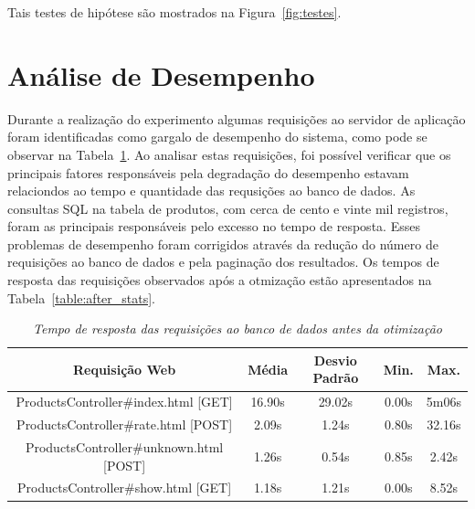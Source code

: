  Tais testes de hipótese são mostrados na Figura~\ref{fig:testes}.

\section{Análise de Desempenho}
\label{sec:analise_de_desempenho}


Durante a realização do experimento algumas requisições ao servidor de aplicação foram identificadas como gargalo de desempenho do sistema, como pode se observar na Tabela~\ref{table:before_stats}. Ao analisar estas requisições, foi possível verificar que os principais fatores responsáveis pela degradação do desempenho estavam relaciondos ao tempo e quantidade das requsições ao banco de dados. As consultas SQL na tabela de produtos, com cerca de cento e vinte mil registros, foram as principais responsáveis pelo excesso no tempo de resposta. Esses problemas de desempenho foram corrigidos através da redução do número de requisições ao banco de dados e pela paginação dos resultados. Os tempos de resposta das requisições observados após a otmização estão apresentados na Tabela~\ref{table:after_stats}.

\begin{table}\centering
\begin{tabular}{c c c c c}
\hline \hline
\textbf{Requisição Web}
& \textbf{Média}
& \textbf{Desvio Padrão}
& \textbf{Min.} 
& \textbf{Max.} \\ \hline
ProductsController\#index.html [GET]    & 16.90s & 29.02s &  0.00s &  5m06s \\
\hline
ProductsController\#rate.html [POST]    &  2.09s &  1.24s &  0.80s & 32.16s \\
\hline
ProductsController\#unknown.html [POST] &  1.26s &  0.54s &  0.85s &  2.42s \\
\hline
ProductsController\#show.html [GET]     &  1.18s &  1.21s &  0.00s &  8.52s \\
\hline
\end{tabular}
\caption{\it Tempo de resposta das requisições ao banco de dados antes da otimização \label{table:before_stats}}
\end{table}

